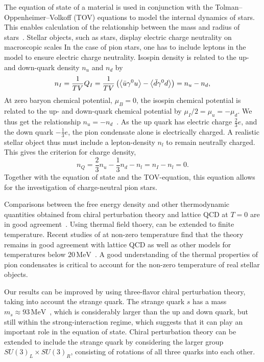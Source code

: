 The equation of state of a material is used in conjunction with the Tolman–Oppenheimer–Volkoff (TOV) equations to model the internal dynamics of stars.
This enables calculation of the relationship between the mass and radius of stars~\cite{Carroll:spacetime}.
Stellar objects, such as stars, display electric charge neutrality on macroscopic scales
In the case of pion stars, one has to include leptons in the model to ensure electric charge neutrality.
Isospin density is related to the up- and down-quark density $n_u$ and $n_d$ by
\begin{equation}
    n_I 
    = \frac{1}{TV} Q_I 
    = \frac{1}{TV} \left(\ex{\bar u \gamma^0 u} - \ex{\bar d \gamma^0 d} \right) 
    = n_u - n_d,
\end{equation}
At zero baryon chemical potential, $\mu_B = 0$, the isospin chemical potential is related to the up- and down-quark chemical potential by $\mu_I/2 = \mu_u = -\mu_d$.
We thus get the relationship $n_u = -n_d$~\cite{new_clas_of_compact_stars}.
As the up quark has electric charge $\frac{2}{3}e$, and the down quark $-\frac{1}{3}e$, the pion condensate alone is electrically charged.
A realistic stellar object thus must include a lepton-density $n_l$ to remain neutrally charged.
This gives the criterion for charge density,
\begin{equation}
    n_Q = \frac{2}{3}n_u - \frac{1}{3} n_d - n_l = n_I - n_l = 0.
\end{equation}
Together with the equation of state and the TOV-equation, this equation allows for the investigation of charge-neutral pion stars.

Comparisons between the free energy density and other thermodynamic quantities obtained from chiral perturbation theory and lattice QCD at $T = 0$ are in good agreement~\cite{Andersen:two-flavor-chpt,mojahed}.
Using thermal field thoery, \chpt can be extended to finite temperature.
Recent 
studies of \chpt at non-zero temperature find that the theory remains in good agreement with lattice QCD as well as other models for temperatures below $20 \, \text{MeV}$~\cite{andersen_mojahed:condensates_and_pressure}.
A good understanding of the thermal properties of pion condensates is critical to account for the non-zero temperature of real stellar objects.

Our results can be improved by using three-flavor chiral perturbation theory, taking into account the strange quark.
The strange quark $s$ has a mass $m_s \approx 93 \, \text{MeV}$~\cite{PDG}, which is considerably larger than the up and down quark, but still within the strong-interaction regime, which suggests that it can play an important role in the equation of state.
Chiral perturbation theory can be extended to include the strange quark by considering the larger group $SU(3)_L \times SU(3)_R$, consisting of rotations of all three quarks into each other.
